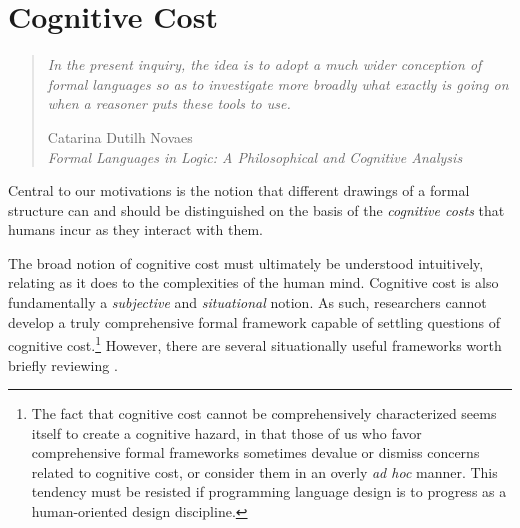 
\section{Cognitive Cost}\label{sec:syntactic-properties}
\begin{quote}
\emph{In the present inquiry, the idea is to adopt a much
wider conception of formal languages so as to investigate more broadly what
exactly is going on when a reasoner puts these tools to use.}

\begin{flushright}Catarina Dutilh Novaes\\
\emph{Formal Languages in Logic: A Philosophical and Cognitive Analysis} \cite{novaes2012formal}
\end{flushright}
\end{quote}

Central to our motivations is the notion that different drawings of a formal structure can and should be distinguished on the basis of the  \emph{cognitive costs} that humans incur as they interact with them. 

The broad notion of cognitive cost must ultimately be understood intuitively, relating as it does to the complexities of the human mind. Cognitive cost is also fundamentally a \emph{subjective} and \emph{situational} notion. 
As such, researchers cannot develop a truly comprehensive formal framework capable of settling questions of cognitive cost.\footnote{The fact that cognitive cost cannot be comprehensively characterized seems itself to create a cognitive hazard, in that those of us who favor comprehensive formal frameworks sometimes devalue or dismiss concerns related to cognitive cost, or consider them in an overly \emph{ad hoc} manner. This tendency must be resisted if programming language design is to progress as a human-oriented design discipline.} However, there are several situationally useful frameworks worth briefly reviewing \cite{box1987empirical}. %



